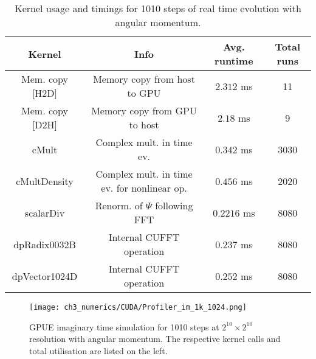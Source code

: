\begin{table}\label{tbl:gpue_ev}
    \small
    \centering
\begin{tabular}{c|c|c|c}
\textbf{Kernel}  & \textbf{Info} & \textbf{Avg. runtime} & \textbf{Total runs} \\
\hline
Mem. copy [H2D] & Memory copy from host to GPU & $2.312$ ms & 11 \\
Mem. copy [D2H] & Memory copy from GPU to host & $2.18$ ms & 9 \\
cMult & Complex mult. in time ev. & $0.342$ ms & 3030 \\
cMultDensity & Complex mult. in time ev. for nonlinear op. & $0.456$ ms & 2020 \\
scalarDiv & Renorm. of $\Psi$ following FFT & $0.2216$ ms & 8080 \\
dpRadix0032B & Internal CUFFT operation & $0.237$ ms & 8080 \\
dpVector1024D & Internal CUFFT operation & $0.252$ ms & 8080 \\
\end{tabular}
\caption{Kernel usage and timings for 1010 steps of real time evolution with angular momentum.}

\end{table}


\begin{figure}
    \centering
    \texttt{[image: ch3\_numerics/CUDA/Profiler\_im\_1k\_1024.png]}
    \caption{GPUE imaginary time simulation for 1010 steps at $2^{10}\times 2^{10}$ resolution with angular momentum. The respective kernel calls and total utilisation are listed on the left.}
    \label{fig:profile_im}
\end{figure}

